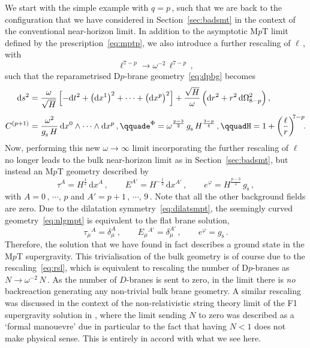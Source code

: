 \documentclass[11pt]{article}
\newcommand{\be}{\begin{equation}}
\newcommand{\ee}{\end{equation}}
\renewcommand{\emph}[1]{\textit{#1}}
\newcommand{\dd}{\mathrm{d}}
\begin{document}
We start with the simple example with $q = p$\,, such that we are back to the configuration that we have considered in Section~\ref{sec:badsmt} in the context of the conventional near-horizon limit. In addition to the asymptotic M$p$T limit defined by the prescription~\eqref{eq:mptp}, we also introduce a further rescaling of $\ell$\,, with 
%
\be \label{eq:rsl}
    \ell^{7 - p} \rightarrow \omega^{-2} \, \ell^{7-p}\,,
\ee
%
such that the reparametrised D$p$-brane geometry~\eqref{eq:dpbg} becomes
%
\begin{subequations}
\begin{align}
    \dd s^2 & = \frac{\omega}{\sqrt{H}} \, \Bigl[ - \dd t^2 + \bigl( \dd x^1 \bigr)^2 + \cdots + \bigl( \dd x^p \bigr)^2 \Bigr] + \frac{\sqrt{H}}{\omega} \, \Bigl( \dd r^2 + r^2 \, \dd\Omega^2_{8-p} \Bigr)\,, \\[4pt]
    C^{(p+1)} & = \frac{\omega^2}{g^{}_\text{s} \, H} \, \dd x^0 \wedge \cdots \wedge \dd x^p\,,
        \qquad%
    e^\Phi = \omega^{\frac{p-3}{2}} \, g^{}_\text{s} \, H^{\frac{3-p}{4}}\,,
        \qquad%
    H = 1 + \left( \frac{\ell}{r} \right)^{\!\!7-p}\!\!.
\end{align}
\end{subequations}
%
Now, performing this new $\omega \rightarrow \infty$ limit incorporating the further rescaling of $\ell$ no longer leads to the bulk near-horizon limit as in Section~\ref{sec:badsmt}, but instead an M$p$T geometry described by
%
\be \label{eq:nlgmpt}
    \tau^A = H^{\frac{1}{2}} \, \dd x^A\,,
        \qquad%
    E^{A'} = H^{-\frac{1}{2}} \, \dd x ^{A'}\,,
        \qquad%
    e^\varphi = H^{\frac{p-3}{2}} \, g^{}_\text{s}\,,
\ee
%
with $A = 0\,, \, \cdots, \, p$ and $A' = p+1\,, \, \cdots, \, 9$\,. Note that all the other background fields are zero. Due to the dilatation symmetry~\eqref{eq:dilatsmpt}, the seemingly curved geometry~\eqref{eq:nlgmpt} is equivalent to the flat brane solution,
%
\be
    \tau^{}_\mu{}^A = \delta^A_\mu\,,
        \qquad%
    E^{}_\mu{}^{A'} = \delta^{A'}_\mu\,,
        \qquad%
    e^\varphi = g^{}_\text{s}\,.
\ee
%
Therefore, the solution that we have found in fact describes a ground state in the M$p$T supergravity. This trivialisation of the bulk geometry is of course due to the rescaling~\eqref{eq:rsl}, which is equivalent to rescaling the number of D$p$-branes as $N \rightarrow \omega^{-2} \, N$\,. As the number of $D$-branes is sent to zero, in the limit there is \emph{no} backreaction generating any non-trivial bulk brane geometry.
A similar rescaling was discussed in the context of the non-relativistic string theory limit of the F1 supergravity solution in \cite{Avila:2023aey}, where the limit sending $N$ to zero was described as a `formal manouevre' due in particular to the fact that having $N < 1$ does not make physical sense. This is entirely in accord with what we see here.
\end{document}
